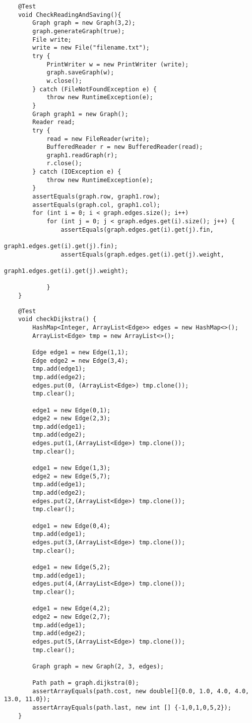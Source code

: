 \documentclass[]{article}
\begin{document}
\begin{verbatim}
    @Test
    void CheckReadingAndSaving(){
        Graph graph = new Graph(3,2);
        graph.generateGraph(true);
        File write;
        write = new File("filename.txt");
        try {
            PrintWriter w = new PrintWriter (write);
            graph.saveGraph(w);
            w.close();
        } catch (FileNotFoundException e) {
            throw new RuntimeException(e);
        }
        Graph graph1 = new Graph();
        Reader read;
        try {
            read = new FileReader(write);
            BufferedReader r = new BufferedReader(read);
            graph1.readGraph(r);
            r.close();
        } catch (IOException e) {
            throw new RuntimeException(e);
        }
        assertEquals(graph.row, graph1.row);
        assertEquals(graph.col, graph1.col);
        for (int i = 0; i < graph.edges.size(); i++)
            for (int j = 0; j < graph.edges.get(i).size(); j++) {
                assertEquals(graph.edges.get(i).get(j).fin, 
                                        graph1.edges.get(i).get(j).fin);
                assertEquals(graph.edges.get(i).get(j).weight, 
                                        graph1.edges.get(i).get(j).weight);

            }
    }
\end{verbatim}
\begin{verbatim}
    @Test
    void checkDijkstra() {
        HashMap<Integer, ArrayList<Edge>> edges = new HashMap<>();
        ArrayList<Edge> tmp = new ArrayList<>();

        Edge edge1 = new Edge(1,1);
        Edge edge2 = new Edge(3,4);
        tmp.add(edge1);
        tmp.add(edge2);
        edges.put(0, (ArrayList<Edge>) tmp.clone());
        tmp.clear();

        edge1 = new Edge(0,1);
        edge2 = new Edge(2,3);
        tmp.add(edge1);
        tmp.add(edge2);
        edges.put(1,(ArrayList<Edge>) tmp.clone());
        tmp.clear();

        edge1 = new Edge(1,3);
        edge2 = new Edge(5,7);
        tmp.add(edge1);
        tmp.add(edge2);
        edges.put(2,(ArrayList<Edge>) tmp.clone());
        tmp.clear();

        edge1 = new Edge(0,4);
        tmp.add(edge1);
        edges.put(3,(ArrayList<Edge>) tmp.clone());
        tmp.clear();

        edge1 = new Edge(5,2);
        tmp.add(edge1);
        edges.put(4,(ArrayList<Edge>) tmp.clone());
        tmp.clear();

        edge1 = new Edge(4,2);
        edge2 = new Edge(2,7);
        tmp.add(edge1);
        tmp.add(edge2);
        edges.put(5,(ArrayList<Edge>) tmp.clone());
        tmp.clear();

        Graph graph = new Graph(2, 3, edges);

        Path path = graph.dijkstra(0);
        assertArrayEquals(path.cost, new double[]{0.0, 1.0, 4.0, 4.0, 13.0, 11.0});
        assertArrayEquals(path.last, new int [] {-1,0,1,0,5,2});
    }
\end{verbatim}
\end{document}
